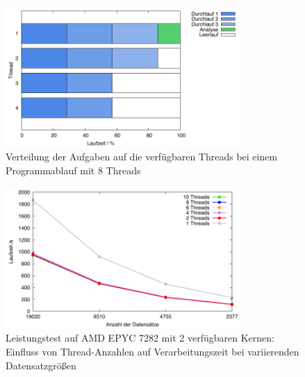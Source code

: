 \begin{figure}[htbp!]
  \centering
  \includegraphics[width=0.8\textwidth]{../results/plots/timeline/timeline_plot_4threads.pdf}
  \caption{Verteilung der Aufgaben auf die verfügbaren Threads bei einem Programmablauf mit 8 Threads}
  \label{fig:runtime_timeline_4threads}
\end{figure}

\begin{figure}[H]
\centering
\includegraphics[width=0.8\textwidth]{../results/plots/vps/comp_all_threads.pdf}
\caption{Leistungstest auf AMD EPYC 7282 mit 2 verfügbaren Kernen: Einfluss von Thread-Anzahlen auf Verarbeitungszeit bei variierenden Datensatzgrößen}
\label{fig:vps_benchmark_threads}
\end{figure}

